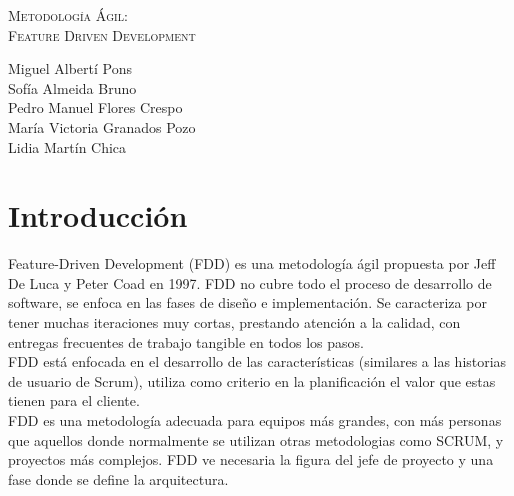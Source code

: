 \documentclass[11pt]{article}
\begin{document}
\begin{titlepage}
\centering
\vspace{4.5cm}
{\scshape\LARGE Metodología Ágil:\\ Feature Driven Development\par}
\vspace{1.5cm}


\vspace{3cm}
{\scshape\large \par}
\vspace{1cm}

{Miguel Albertí Pons\\
Sofía Almeida Bruno\\
Pedro Manuel Flores Crespo\\
María Victoria Granados Pozo\\
Lidia Martín Chica
\par}

\end{titlepage}

\thispagestyle{empty}
\tableofcontents

\newpage

\section{Introducción}

Feature-Driven Development (FDD) es una metodología ágil propuesta por Jeff De Luca y Peter Coad en 1997. FDD no cubre todo el proceso de desarrollo de software, se enfoca en las fases de diseño e implementación. Se caracteriza por tener muchas iteraciones muy cortas, prestando atención a la calidad, con entregas frecuentes de trabajo tangible en todos los pasos.\\

FDD está enfocada en el desarrollo de las características (similares a las historias de usuario de Scrum), utiliza como criterio en la planificación el valor que estas tienen para el cliente.\\

FDD es una metodología adecuada para equipos más grandes, con más personas que aquellos donde normalmente se utilizan otras metodologias como SCRUM, y proyectos más complejos. FDD ve necesaria la figura del jefe de proyecto y una fase donde se define la arquitectura.\\
\end{document}
